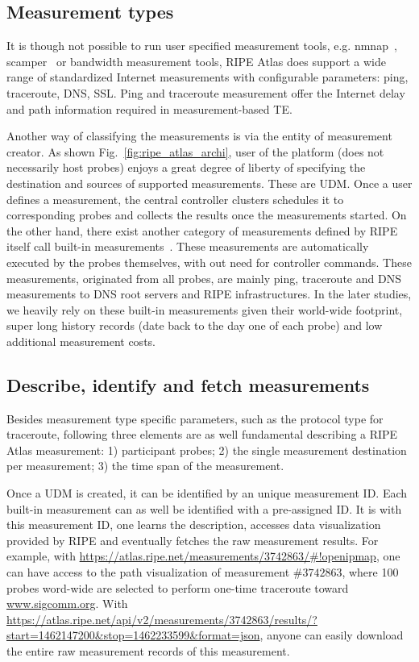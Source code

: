 \subsection{Measurement types}
It is though not possible to run user specified measurement tools, e.g. nmnap~\cite{nmap}, scamper~\cite{luckie2010scamper} or bandwidth measurement tools, RIPE Atlas does support a wide range of standardized Internet measurements with configurable parameters: ping, traceroute, DNS, SSL.
Ping and traceroute measurement offer the Internet delay and path information required in measurement-based TE.

Another way of classifying the measurements is via the entity of measurement creator. As shown Fig.~\ref{fig:ripe_atlas_archi}, user of the platform (does not necessarily host probes) enjoys a great degree of 
liberty of specifying the destination and sources of supported measurements. These are \acf{UDM}. Once a user defines a measurement, the central controller clusters schedules it to corresponding probes and collects the results once the measurements started.
On the other hand, there exist another category of measurements defined by RIPE itself call built-in measurements~\cite{atlas}. These measurements are automatically executed by the probes themselves, with out need for controller commands. These measurements, originated from all probes, are mainly ping, traceroute and DNS measurements to DNS root servers and RIPE infrastructures.
In the later studies, we heavily rely on these built-in measurements given their world-wide footprint, super long history records (date back to the day one of each probe) and low additional measurement costs.

\subsection{Describe, identify and fetch measurements}
Besides measurement type specific parameters, such as the protocol type for traceroute, following three elements are as well fundamental describing a RIPE Atlas measurement: 1) participant probes; 2) the single measurement destination per measurement; 3) the time span of the measurement. 

Once a \ac{UDM} is created, it can be identified by an unique measurement ID. 
Each built-in measurement can as well be identified with a pre-assigned ID.
It is with this measurement ID, one learns the description, accesses data visualization provided by RIPE and eventually fetches the raw measurement results.
For example, with \url{https://atlas.ripe.net/measurements/3742863/#!openipmap}, one can have access to the path visualization of measurement $\#3742863$, where 100 probes word-wide are selected to perform one-time traceroute toward \url{www.sigcomm.org}. With \url{https://atlas.ripe.net/api/v2/measurements/3742863/results/?start=1462147200&stop=1462233599&format=json}, anyone can easily download the entire raw measurement records of this measurement.


